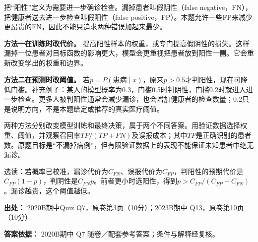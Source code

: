 把“阳性”定义为需要进一步确诊检查。漏掉患者叫假阴性（false negative，FN），把健康者送去进一步检查叫假阳性（false positive，FP）。本题允许一些FP来减少更昂贵的FN，因此不能只追求两种错误加起来最少。


\textbf{方法一在训练时改代价。} 提高阳性样本的权重，或专门提高假阴性的损失。这样漏掉一位患者对目标函数的影响更大，模型会更重视把患者放到阳性一侧。它会重新改变学出的权重和边界。


\textbf{方法二在预测时改阈值。} 若\(p=P(\text{患病}\mid x)\)，原来\(p>0.5\)才判阳性，现在可降低门槛。补充例子：某人的模型概率为0.3，门槛0.5时判阴性，门槛0.2时就进入进一步检查。更多人被判阳性通常会减少漏诊，也会增加健康者的检查数量；0.2只是说明方向，不是本题给定或推荐的真实医疗阈值。


两种方法分别改变模型训练和最终决策，属于两个不同答案。用验证数据选择权重、阈值，并观察召回率\(TP/(TP+FN)\)及误报成本；其中\(TP\)是正确识别的患者数。原题目标是“不漏掉病例”，但有限验证数据上的表现不能保证未知患者中绝无漏诊。


选读：若概率已校准，漏诊代价为\(C_{FN}\)、误报代价为\(C_{FP}\)，判阳性的预期代价是\(C_{FP}(1-p)\)，判阴性是\(C_{FN}p\)。前者更小时选阳性，得到\(p>C_{FP}/(C_{FP}+C_{FN})\)。漏诊越贵，这个阈值越低。


\textbf{出处：} 2020B期中Quiz Q7，原卷第3页（10分）；2023B期中 Q13，原卷第10页（10分）


\textbf{答案依据：} 2020B期中 Q7 随卷／配套参考答案；条件与解释经复核。
